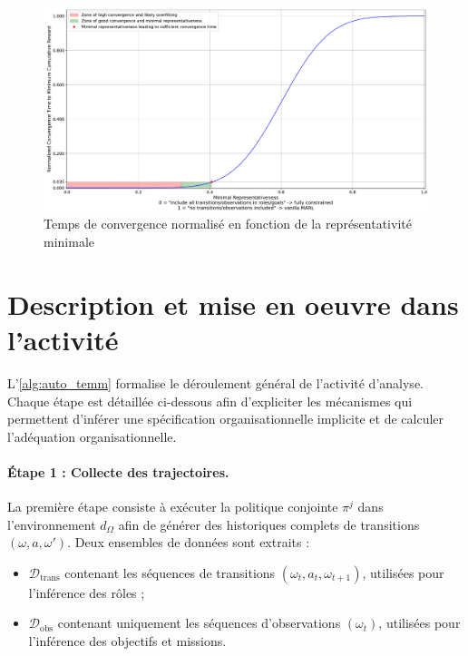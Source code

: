 \begin{figure}[h!]
  \centering
  \includegraphics[trim=0cm 0cm 0cm 0cm, clip, width=1.\linewidth]{figures/convergence_time_relative_to_representativeness.pdf}
  \caption{Temps de convergence normalisé en fonction de la représentativité minimale}
  \label{fig:conv_time_repr}
\end{figure}




\section{Description et mise en oeuvre dans l'activité}

L'\autoref{alg:auto_temm} formalise le déroulement général de l'activité d'analyse.
Chaque étape est détaillée ci-dessous afin d'expliciter les mécanismes qui permettent d'inférer une spécification organisationnelle implicite et de calculer l'adéquation organisationnelle.

\paragraph{Étape 1 : Collecte des trajectoires.}
La première étape consiste à exécuter la politique conjointe $\pi^j$ dans l'environnement $d_\Omega$ afin de générer des historiques complets de transitions $(\omega, a, \omega')$.
Deux ensembles de données sont extraits :
\begin{itemize}
  \item $\mathcal{D}_{\text{trans}}$ contenant les séquences de transitions $(\omega_t, a_t, \omega_{t+1})$, utilisées pour l'inférence des rôles ;
  \item $\mathcal{D}_{\text{obs}}$ contenant uniquement les séquences d'observations $(\omega_t)$, utilisées pour l'inférence des objectifs et missions.
\end{itemize}

